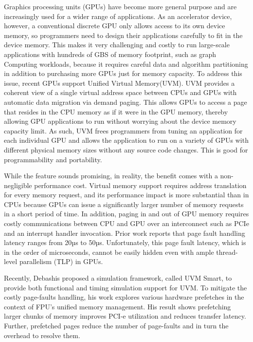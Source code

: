 Graphics processing units (GPUs) have become more general purpose and are increasingly 
used for a wider range of applications. As an accelerator device, however, a conventional
discrete GPU only allows access to its own device memory, so programmers need to design
their applications carefully to fit in the device memory. This makes it very challenging and
costly to run large-scale applications with hundreds of GBS of memory footprint, such as graph
Computing workloads, because it requires careful data and algorithm partitioning in addition to 
purchasing more GPUs just for memory capacity. To address this issue, recent GPUs support Unified 
Virtual Memory(UVM). UVM provides a coherent view of a single virtual address space between CPUs 
and GPUs with automatic data migration via demand paging. This allows GPUs to access a page that 
resides in the CPU memory as if it were in the GPU memory, thereby allowing GPU applications to 
run without worrying about the device memory capacity limit. As such, UVM frees programmers from 
tuning an application for each individual GPU and allows the application to run on a variety 
of GPUs with different physical memory sizes without any source code changes. This is good for 
programmability and portability.

While the feature sounds promising, in reality, the benefit comes with a non-negligible performance 
cost. Virtual memory support requires address translation for every memory request, and its performance 
impact is more substantial than in CPUs because GPUs can issue a significantly larger number of memory 
requests in a short period of time. In addition, paging in and out of GPU memory requires costly
communications between CPU and GPU over an interconnect such as PCIe and an interrupt handler 
invocation. Prior work reports that page fault handling latency ranges from 20µs to 50µs.
Unfortunately, this page fault latency, which is in the order of microseconds, cannot be easily hidden 
even with ample thread-level parallelism (TLP) in GPUs.

Recently, Debashis proposed a simulation framework, called UVM Smart, to provide
both functional and timing simulation support for UVM. To mitigate the costly page-faults handling, 
his work explores various hardware prefetches in the context of FPU's unified memory management. 
His result shows prefetching larger chunks of memory improves PCI-e utilization and reduces transfer 
latency. Further, prefetched pages reduce the number of page-faults and in turn the overhead to resolve them.